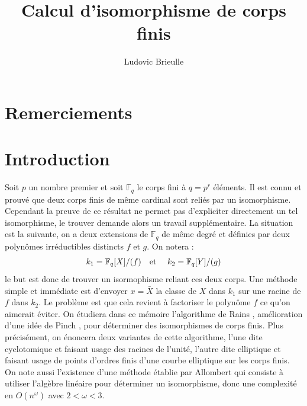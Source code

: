 \documentclass[a4paper]{article} %
\numberwithin{section}{part}
\numberwithin{equation}{section}
\newcommand\GF[1]{\mathbb{F}_{#1}}
\newcommand\etmath{\textup{\quad et \quad}}
\begin{document}
\title{Calcul d'isomorphisme de corps finis}
\author{Ludovic Brieulle}
\newtheorem{thm}{Théorème}[section]
\newtheorem{lem}[thm]{Lemme}
\newtheorem{cor}[thm]{Corollaire}
\newtheorem{prop}[thm]{Proposition}
\newtheorem{conj}[thm]{Conjecture}
\theoremstyle{definition}
\newtheorem{defn}[thm]{Définition}
\newtheorem{defnp}[thm]{Définition et proposition}
\newtheorem*{ex}{Exemple}
\theoremstyle{remark}
\newtheorem*{rem}{Remarque}

\maketitle
\part*{Remerciements}

\part*{Introduction}
Soit $p$ un nombre premier et soit $\GF{q}$ le corps fini à $q = p^r$ éléments. 
Il est connu et prouvé que deux corps finis de même cardinal sont reliés par
un isomorphisme. Cependant la preuve de ce résultat ne permet pas d'expliciter
directement un tel isomorphisme, le trouver demande alors un travail 
supplémentaire. La situation est la suivante, on a deux extensions de 
$\GF{q}$ de même degré et définies par deux polynômes irréductibles distincts 
$f$ et $g$. On notera :
\[k_1=\GF{q}[X]/(f)\etmath k_2=\GF{q}[Y]/(g)\]
le but est donc de trouver un isormophisme reliant ces deux corps. 
Une méthode simple et immédiate est d'envoyer $x = \bar{X}$ la classe de $X$
dans $k_1$ sur une racine de $f$ dans $k_2$. Le problème est que cela revient à 
factoriser le polynôme $f$ ce qu'on aimerait éviter. On étudiera dans ce mémoire
l'algorithme de Rains \cite{Rai}, amélioration d'une idée de Pinch \cite{Pin},
pour déterminer des isomorphismes de corps finis. Plus précisément, on énoncera
deux variantes de cette algorithme, l'une dite cyclotomique et faisant usage des
racines de l'unité, l'autre dite elliptique et faisant usage de points d'ordres
finis d'une courbe elliptique sur les corps finis.
On note aussi l'existence d'une méthode établie par Allombert \cite{All} qui 
consiste à utiliser l'algèbre linéaire pour déterminer un isomorphisme, donc une
complexité en $O(n^{\omega})$ avec $2<\omega<3$.\par

\newpage
\tableofcontents
\newpage
\end{document}
